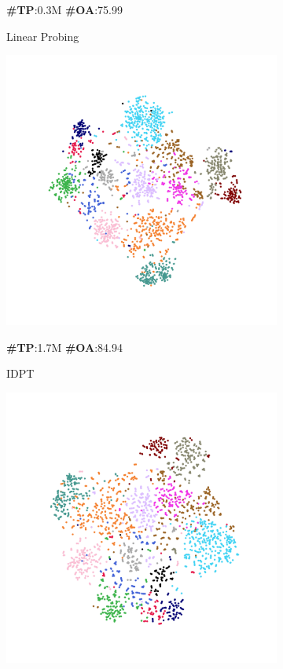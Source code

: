 \begin{figure}
\begin{subfigure}{0.24\textwidth}
        \caption*{\textbf{\#TP}:0.3M \textbf{\#OA}:75.99}
        \caption{Linear Probing}
        \label{fig:sub2}
    \end{subfigure}
    \hfill
    \begin{subfigure}{0.24\textwidth}
        \centering
        \includegraphics[width=\linewidth]{fig/tsne/idpt.pdf}
        \caption*{\textbf{\#TP}:1.7M \textbf{\#OA}:84.94}
        \caption{IDPT}
        \label{fig:sub3}
    \end{subfigure}
    \hfill
    \begin{subfigure}{0.24\textwidth}
        \centering
        \includegraphics[width=\linewidth]{fig/tsne/dapt.pdf}

\end{subfigure}
\end{figure}
